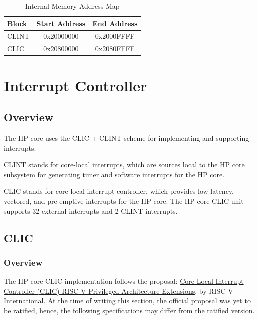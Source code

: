\documentclass[main\_\_EN.tex]{subfiles}
\begin{document}
\begin{longtable}{ | l | c | c |}
\caption{Internal Memory Address Map} \label{tab:riscvcpu-tcip-slave-table}
\\ \hline
\rowcolor{lightgray}
Block & Start Address & End Address \\ \hline
CLINT & 0x20000000  &  0x2000FFFF\\ \hline
CLIC & 0x20800000  &  0x2080FFFF\\ \hline
\end{longtable}

\newpage
\section{Interrupt Controller}
\label{sec:riscvcpu-int-ctrl}


\subsection{Overview}
\label{sec:riscvcpu-intr-overview}


The HP core uses the CLIC + CLINT scheme for implementing and supporting interrupts.

CLINT stands for core-local interrupts, which are sources local to the HP core subsystem for generating timer and software interrupts for the HP core.

CLIC stands for core-local interrupt controller, which provides low-latency, vectored, and pre-emptive interrupts for the HP core. The HP core CLIC unit supports 32 external interrupts and 2 CLINT interrupts.


\subsection{CLIC}
\label{sec:riscvcpu-clic}
\subsubsection{Overview}
\label{sec:riscvcpu-clic-overview}

The HP core CLIC implementation follows the proposal: \hyperlink{https://github.com/riscv/riscv-fast-interrupt/blob/26d29ce6ab7f1def8e5dc0a41639a1d8f67ea339/clic.adoc}{Core-Local Interrupt Controller (CLIC) RISC-V Privileged Architecture Extensions}, by RISC-V International. At the time of writing this section, the official proposal was yet to be ratified, hence, the following specifications may differ from the ratified version.
\end{document}
